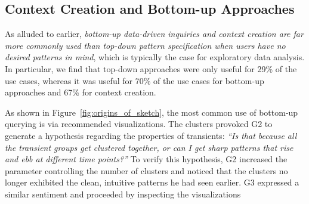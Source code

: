 \subsection{Context Creation and Bottom-up Approaches}
\par As alluded to earlier, 
\emph{bottom-up data-driven inquiries 
and context creation are far more commonly 
used than top-down pattern specification 
when users have no desired patterns in mind}, 
which is typically the case for exploratory data analysis. 
In particular, we find that top-down approaches 
were only useful for 29\% of the use cases, 
whereas it was useful for 70\% of the use cases 
for bottom-up approaches and 67\% 
for context creation. 
\par As shown in Figure~\ref{fig:origins_of_sketch}, 
the most common use of bottom-up querying 
is via recommended visualizations. 
The clusters provoked G2 to generate a hypothesis 
regarding the properties of transients: 
\textit{``Is that because all the transient groups 
get clustered together, or can I get sharp patterns 
that rise and ebb at different time points?''} 
To verify this hypothesis, G2 increased the parameter controlling the number of clusters and noticed that the clusters
no longer exhibited the clean, 
intuitive patterns he had seen earlier. 
G3 expressed a similar sentiment and proceeded 
by inspecting the visualizations 
